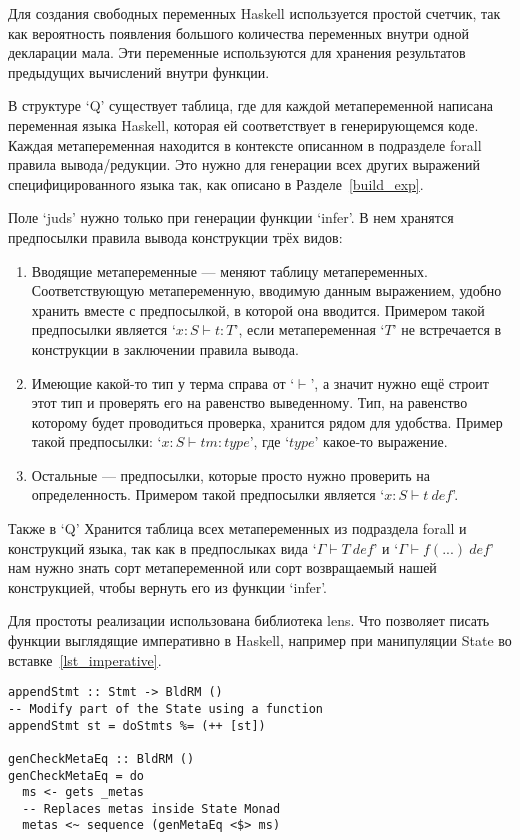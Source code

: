 Для создания свободных переменных Haskell используется простой счетчик, так как вероятность появления большого количества переменных внутри одной декларации мала. Эти переменные используются для хранения результатов предыдущих вычислений внутри функции.

В структуре `Q' существует таблица, где для каждой метапеременной написана переменная языка Haskell, которая ей соответствует в генерирующемся коде. Каждая метапеременная находится в контексте описанном в подразделе forall правила вывода/редукции. Это нужно для генерации всех других выражений специфицированного языка так, как описано в Разделе~\ref{build_exp}.

Поле `juds' нужно только при генерации функции `infer'. В нем хранятся предпосылки правила вывода конструкции трёх видов:
\begin{enumerate}
  \item Вводящие метапеременные --- меняют таблицу метапеременных. Соответствующую метапеременную, вводимую данным выражением, удобно хранить вместе с предпосылкой, в которой она вводится. Примером такой предпосылки является `$x : S \vdash t : T$', если метапеременная `$T$' не встречается в конструкции в заключении правила вывода.
  \item Имеющие какой-то тип у терма справа от `$\vdash$', а значит нужно ещё строит этот тип и проверять его на равенство выведенному. Тип, на равенство которому будет проводиться проверка, хранится рядом для удобства. Пример такой предпосылки: `$x : S \vdash tm : type$', где `$type$' какое-то выражение.
  \item Остальные --- предпосылки, которые просто нужно проверить на определенность. Примером такой предпосылки является `$x : S \vdash t\ def$'.
\end{enumerate}

Также в `Q' Хранится таблица всех метапеременных из подраздела forall и конструкций языка, так как в предпослыках вида `$\Gamma \vdash T\ def$' и `$\Gamma \vdash f(...)\ def$' нам нужно знать сорт метапеременной или сорт возвращаемый нашей конструкцией, чтобы вернуть его из функции `infer'.

Для простоты реализации использована библиотека lens\cite{lens}. Что позволяет писать функции выглядящие императивно в Haskell, например при манипуляции State во вставке~\ref{lst_imperative}.

\begin{lstlisting}[caption={Примеры ``императивного'' кода внутри монады State c использованием библиотеки lens},captionpos=b,frame=single, float, floatplacement=H, label={lst_imperative}]
appendStmt :: Stmt -> BldRM ()
-- Modify part of the State using a function
appendStmt st = doStmts %= (++ [st])

genCheckMetaEq :: BldRM ()
genCheckMetaEq = do
  ms <- gets _metas
  -- Replaces metas inside State Monad
  metas <~ sequence (genMetaEq <$> ms)
\end{lstlisting}


